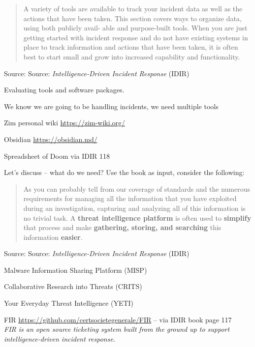 \documentclass[Screen16to9,17pt]{foils}
\begin{document}


\begin{quote}
A variety of tools are available to track your incident data as well as the actions that
have been taken. This section covers ways to organize data, using both publicly avail‐
able and purpose-built tools. When you are just getting started with incident
response and do not have existing systems in place to track information and actions
that have been taken, it is often best to start small and grow into increased capability
and functionality.
\end{quote}
Source: Source: \emph{Intelligence-Driven Incident Response} (IDIR)

\begin{list2}
\item Evaluating tools and software packages.
\item We know we are going to be handling incidents, we need multiple tools
\end{list2}





\begin{list2}
\item Zim personal wiki \url{https://zim-wiki.org/}
\item Obsidian \url{https://obsidian.md/}
\item Spreadsheet of Doom via IDIR 118
\end{list2}


Let's discuss -- what do we need? Use the book as input, consider the following:

\begin{quote}
As you can probably tell from our coverage of standards and the numerous requirements for managing all the information that you have exploited during an investigation, capturing and analyzing all of this information is no trivial task. A {\bf threat intelligence platform} is often used to {\bf simplify} that process and make {\bf gathering, storing, and searching} this information {\bf easier}.
\end{quote}
Source: Source: \emph{Intelligence-Driven Incident Response} (IDIR)


\begin{list2}
\item Malware Information Sharing Platform (MISP)
\item Collaborative Research into Threats (CRITS)
\item Your Everyday Threat Intelligence (YETI)
\item FIR \url{https://github.com/certsocietegenerale/FIR} -- via IDIR book page 117\\
\emph{FIR is an open source ticketing system built from the
ground up to support intelligence-driven incident response.}
\end{list2}
\end{document}
